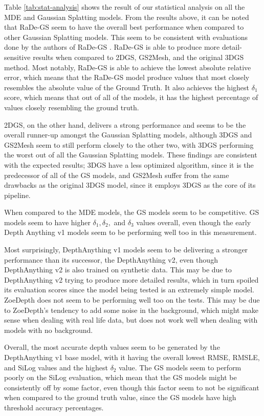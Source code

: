 Table \ref{tab:stat-analysis} shows the result of our statistical analysis on all the MDE and Gaussian Splatting models. From the results above, it can be noted that RaDe-GS seem to have the overall best performance when compared to other Gaussian Splatting models. This seem to be consistent with evaluations done by the authors of RaDe-GS \parencite{radegs}. RaDe-GS is able to produce more detail-sensitive results when compared to 2DGS, GS2Mesh, and the original 3DGS method. Most notably, RaDe-GS is able to achieve the lowest absolute relative error, which means that the RaDe-GS model produce values that most closely resembles the absolute value of the Ground Truth. It also achieves the highest \(\delta_1\) score, which means that out of all of the models, it has the highest percentage of values closely resembling the ground truth.

2DGS, on the other hand, delivers a strong performance and seems to be the overall runner-up amongst the Gaussian Splatting models, although 3DGS and GS2Mesh seem to still perform closely to the other two, with 3DGS performing the worst out of all the Gaussian Splatting models. These findings are consistent with the expected results; 3DGS have a less optimized algorithm, since it is the predecessor of all of the GS models, and GS2Mesh suffer from the same drawbacks as the original 3DGS model, since it employs 3DGS as the core of its pipeline.

When compared to the MDE models, the GS models seem to be competitive. GS models seem to have higher \(\delta_1, \delta_2,\) and \(\delta_3\) values overall, even though the early Depth Anything v1 models seem to be performing well too in this measurement.

Most surprisingly, DepthAnything v1 models seem to be delivering a stronger performance than its successor, the DepthAnything v2, even though DepthAnything v2 is also trained on synthetic data. This may be due to DepthAnything v2 trying to produce more detailed results, which in turn spoiled its evaluation scores since the model being tested is an extremely simple model. ZoeDepth does not seem to be performing well too on the tests. This may be due to ZoeDepth's tendency to add some noise in the background, which might make sense when dealing with real life data, but does not work well when dealing with models with no background.

Overall, the most accurate depth values seem to be generated by the DepthAnything v1 base model, with it having the overall lowest RMSE, RMSLE, and SiLog values and the highest \(\delta_2\) value. The GS models seem to perform poorly on the SiLog evaluation, which mean that the GS models might be consistently off by some factor, even though this factor seem to not be significant when compared to the ground truth value, since the GS models have high threshold accuracy percentages.

